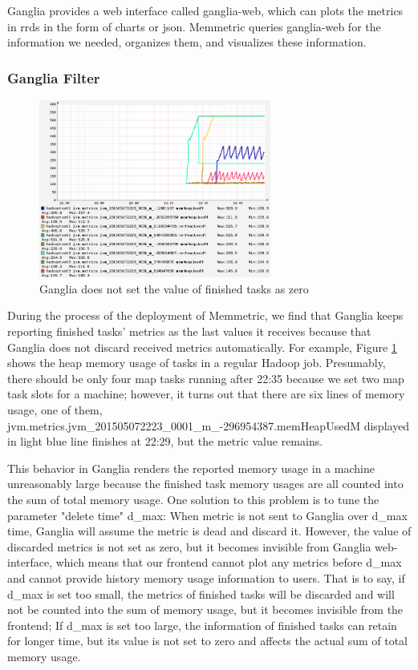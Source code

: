 Ganglia provides a web interface called ganglia-web, which can plots the metrics in rrds in the form of charts or json. Memmetric queries ganglia-web for the information we needed, organizes them, and visualizes these information. 

\subsubsection{Ganglia Filter}

\begin{figure}[ht]
  \centering
    \includegraphics[width=3.0in]{image/ganglia_finished_tasks.png}
    \caption{Ganglia does not set the value of finished tasks as zero}
    \label{ref:gangliah_bug}
\end{figure}

During the process of the deployment of Memmetric, we find that Ganglia keeps reporting finished tasks' metrics as the last values it receives because that Ganglia does not discard received metrics automatically. For example, Figure \ref{ref:gangliah_bug} shows the heap memory usage of tasks in a regular Hadoop job. Presumably, there should be only four map tasks running after 22:35 because we set two map task slots for a machine; however, it turns out that there are six lines of memory usage, one of them, jvm.metrics.jvm\_201505072223\_0001\_m\_-296954387.memHeapUsedM displayed in light blue line finishes at 22:29, but the metric value remains.

This behavior in Ganglia renders the reported memory usage in a machine unreasonably large because the finished task memory usages are all counted into the sum of total memory usage. One solution to this problem is to tune the parameter "delete time" d\_max: When metric is not sent to Ganglia over d\_max time, Ganglia will assume the metric is dead and discard it. However, the value of discarded metrics is not set as zero, but it becomes invisible from Ganglia web-interface, which means that our frontend cannot plot any metrics before d\_max and cannot provide history memory usage information to users. That is to say, if d\_max is set too small, the metrics of finished tasks will be discarded and  will not be counted into the sum of memory usage, but it becomes invisible from the frontend; If d\_max is set too large, the information of finished tasks can retain for longer time, but its value is not set to zero and affects the actual sum of total memory usage.


